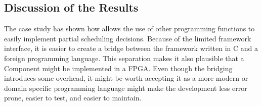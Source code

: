 \subsection{Discussion of the Results}

The case study has shown how \cobas{} allows the use of other programming functions to easily implement partial scheduling decisions. Because of the limited framework interface, it is easier to create a bridge between the framework written in C and a foreign programming language. This separation makes it also plausible that a \cobas{} Component might be implemented in a \ac{FPGA}. Even though the bridging introduces some overhead, it might be worth accepting it as a more modern or domain specific programming language might make the development less error prone, easier to test, and easier to maintain.
